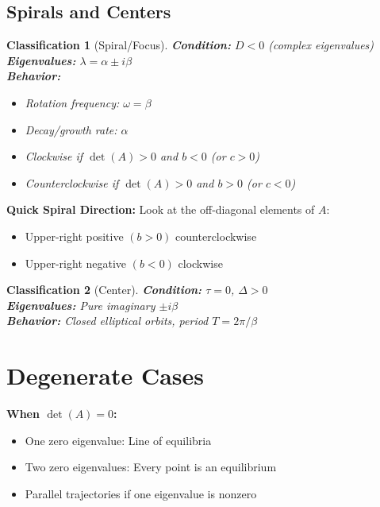 \documentclass[12pt]{article}
\newtheorem{classification}{Classification}
\begin{document}
\subsection{Spirals and Centers}

\begin{classification}[Spiral/Focus]
\textbf{Condition:} $D < 0$ (complex eigenvalues)\\
\textbf{Eigenvalues:} $\lambda = \alpha \pm i\beta$\\
\textbf{Behavior:}
\begin{itemize}
    \item Rotation frequency: $\omega = \beta$
    \item Decay/growth rate: $\alpha$
    \item Clockwise if $\det(A) > 0$ and $b < 0$ (or $c > 0$)
    \item Counterclockwise if $\det(A) > 0$ and $b > 0$ (or $c < 0$)
\end{itemize}
\end{classification}

\begin{insight}
\textbf{Quick Spiral Direction:}
Look at the off-diagonal elements of $A$:
\begin{itemize}
    \item Upper-right positive $(b > 0)$ \rightarrow counterclockwise
    \item Upper-right negative $(b < 0)$ \rightarrow clockwise
\end{itemize}
\end{insight}

\begin{classification}[Center]
\textbf{Condition:} $\tau = 0$, $\Delta > 0$\\
\textbf{Eigenvalues:} Pure imaginary $\pm i\beta$\\
\textbf{Behavior:} Closed elliptical orbits, period $T = 2\pi/\beta$
\end{classification}

\section{Degenerate Cases}

\begin{warning}
\textbf{When $\det(A) = 0$:}
\begin{itemize}
    \item One zero eigenvalue: Line of equilibria
    \item Two zero eigenvalues: Every point is an equilibrium
    \item Parallel trajectories if one eigenvalue is nonzero
\end{itemize}
\end{warning}
\end{document}
